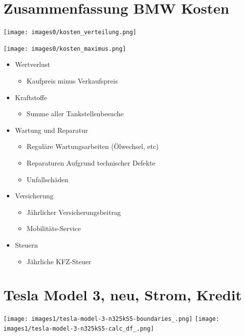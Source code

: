 \documentclass[landscape, DIV=99, 14pt]{scrartcl}
\begin{document}

\twocolumn
\section*{Zusammenfassung BMW Kosten}
\null
\vspace{1cm}
\begin{center}
\texttt{[image: images0/kosten\_verteilung.png]}
\end{center}

\texttt{[image: images0/kosten\_maximus.png]}

\pagebreak

\begin{itemize}
    \item Wertverlust
    \begin{itemize}
        \item Kaufpreis minus Verkaufspreis
    \end{itemize}
    \item Kraftstoffe
    \begin{itemize}
        \item Summe aller Tankstellenbesuche
    \end{itemize}
    \item Wartung und Reparatur
    \begin{itemize}
        \item Regul\"are Wartungsarbeiten (\"Olwechsel, etc)
        \item Reparaturen Aufgrund technischer Defekte
        \item Unfallsch\"aden
    \end{itemize}
    \item Versicherung
    \begin{itemize}
        \item J\"ahrlicher Versicherungsbeitrag
        \item Mobilit\"ats-Service
    \end{itemize}
    \item Steuern
    \begin{itemize}
            \item J\"ahrliche KFZ-Steuer
    \end{itemize}
\end{itemize}


\twocolumn

\section*{Tesla Model 3, neu, Strom, Kredit}
\begin{center}
\texttt{[image: images1/tesla-model-3-n325kS5-boundaries\_.png]}
\null
\vspace{0.5cm}
\texttt{[image: images1/tesla-model-3-n325kS5-calc\_df\_.png]}
\end{center}
\end{document}
